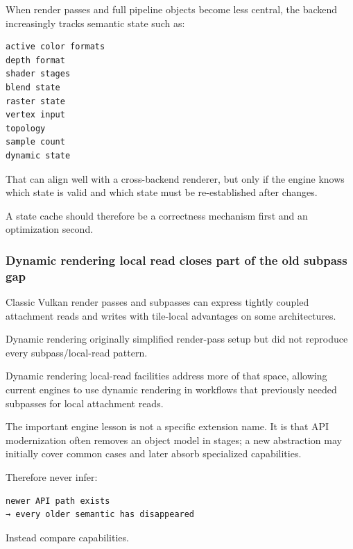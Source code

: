 \hypertarget{05-engine-i-ch023-dynamic-rendering-plus-shader-objects-pushes-the-backend-toward-semantic-state-tracking}{}

When render passes and full pipeline objects become less central, the backend increasingly tracks semantic state such as:

\begin{verbatim}
active color formats
depth format
shader stages
blend state
raster state
vertex input
topology
sample count
dynamic state
\end{verbatim}

That can align well with a cross-backend renderer, but only if the engine knows which state is valid and which state must be re-established after changes.

A state cache should therefore be a correctness mechanism first and an optimization second.

\subsubsection{Dynamic rendering local read closes part of the old subpass gap}\label{05-engine-i-ch023-dynamic-rendering-local-read-closes-part-of-the-old-subpass-gap}

\hypertarget{05-engine-i-ch023-dynamic-rendering-local-read-closes-part-of-the-old-subpass-gap}{}

Classic Vulkan render passes and subpasses can express tightly coupled attachment reads and writes with tile-local advantages on some architectures.

Dynamic rendering originally simplified render-pass setup but did not reproduce every subpass/local-read pattern.

Dynamic rendering local-read facilities address more of that space, allowing current engines to use dynamic rendering in workflows that previously needed subpasses for local attachment reads.

The important engine lesson is not a specific extension name. It is that API modernization often removes an object model in stages; a new abstraction may initially cover common cases and later absorb specialized capabilities.

Therefore never infer:

\begin{verbatim}
newer API path exists
→ every older semantic has disappeared
\end{verbatim}

Instead compare capabilities.

